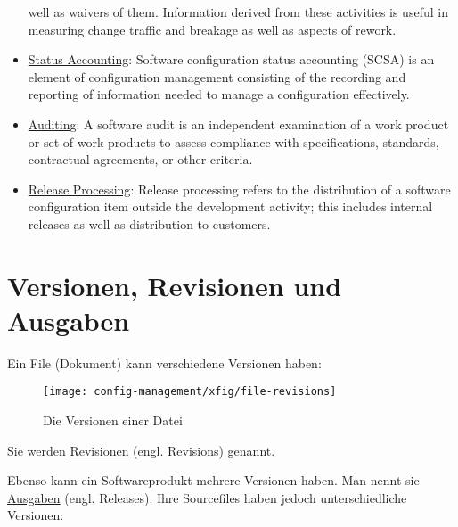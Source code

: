 \begin{itemize}
  well as waivers of them. Information derived from these activities
  is useful in measuring change traffic and breakage as well as aspects
  of rework.
\item \underline{Status Accounting}:
  Software configuration status
  accounting (SCSA) is an element of configuration management
  consisting of the recording and reporting of information needed to
  manage a configuration effectively.
\item \underline{Auditing}:
  A software audit is an independent examination of a work product or set
  of work products to assess compliance with specifications, standards,
  contractual agreements, or other criteria.
\item \underline{Release Processing}:
  Release processing refers to the distribution of a software
  configuration item outside the development activity; this includes
  internal releases as well as distribution to customers.
\end{itemize}
\section{Versionen, Revisionen und Ausgaben}
Ein File (Dokument) kann verschiedene Versionen haben:
\begin{figure}[H]
\begin{center}
\texttt{[image: config-management/xfig/file-revisions]}
\end{center}
\caption{Die Versionen einer Datei}
\end{figure}
Sie werden \underline{Revisionen} (engl. Revisions) genannt.

\ifslides
\else
Ebenso kann ein Softwareprodukt mehrere Versionen haben. Man
nennt sie \underline{Ausgaben} (engl. Releases). Ihre Sourcefiles
haben jedoch unterschiedliche Versionen:

